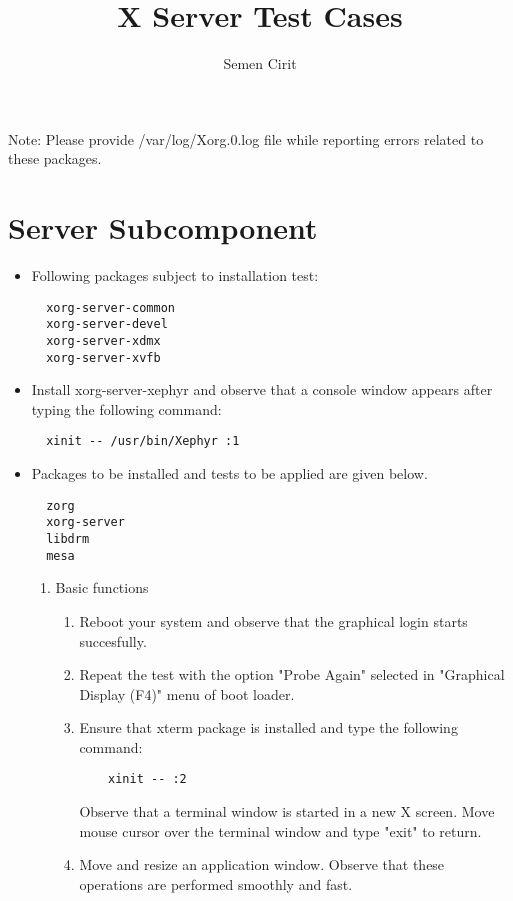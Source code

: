 \documentclass[a4paper,10pt]{article}
\title{X Server Test Cases}
\author{Semen Cirit}
\begin{document}
 

\maketitle

Note: Please provide /var/log/Xorg.0.log file while reporting errors related to these packages.

\section{Server Subcomponent}

\begin{itemize}
  \item Following packages subject to installation test:
  \begin{verbatim}
  xorg-server-common
  xorg-server-devel
  xorg-server-xdmx
  xorg-server-xvfb
  \end{verbatim}

  \item Install xorg-server-xephyr and observe that a console window appears after typing
        the following command:
  \begin{verbatim}
  xinit -- /usr/bin/Xephyr :1
  \end{verbatim}

  \item Packages to be installed and tests to be applied are given below.
  \begin{verbatim}
  zorg    
  xorg-server
  libdrm
  mesa
  \end{verbatim}


  \begin{enumerate}
  \item Basic functions
    \begin{enumerate}
    \item Reboot your system and observe that the graphical login starts succesfully.
    \item Repeat the test with the option "Probe Again" selected in "Graphical Display (F4)" menu of boot loader.
    \item Ensure that xterm package is installed and type the following command:
      \begin{verbatim}
	xinit -- :2
      \end{verbatim}
      Observe that a terminal window is started in a new X screen. Move mouse cursor over the terminal window and type "exit" to return.
    \item Move and resize an application window. Observe that these operations are performed smoothly and fast.
    \end{enumerate}


\end{enumerate}
\end{itemize}
\end{document}
